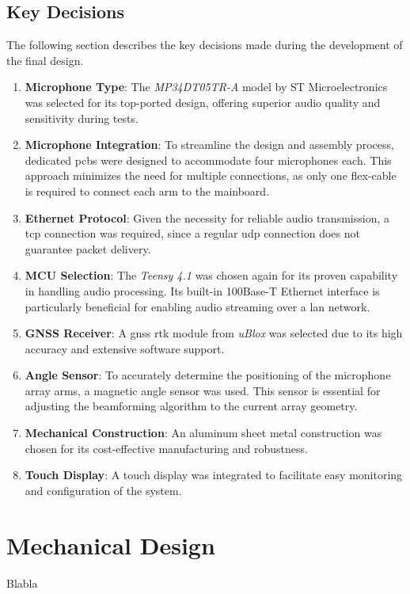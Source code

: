 \subsection{Key Decisions}
The following section describes the key decisions made during the development of the final design.
\begin{enumerate}
	\item \textbf{Microphone Type}: The \textit{MP34DT05TR-A} model by ST Microelectronics was selected for its top-ported design, offering superior audio quality and sensitivity during tests.
	\item \textbf{Microphone Integration}: To streamline the design and assembly process, dedicated \acrshort{pcb}s were designed to accommodate four microphones each.
	      This approach minimizes the need for multiple connections, as only one flex-cable is required to connect each arm to the mainboard.
	\item \textbf{Ethernet Protocol}: Given the necessity for reliable audio transmission, a \acrshort{tcp} connection was required, since a regular \acrshort{udp} connection does not guarantee packet delivery.
	\item \textbf{MCU Selection}: The \textit{Teensy 4.1} was chosen again for its proven capability in handling audio processing.
	      Its built-in 100Base-T Ethernet interface is particularly beneficial for enabling audio streaming over a \acrshort{lan} network.
	\item \textbf{GNSS Receiver}: A \acrshort{gnss} \acrshort{rtk} module from \textit{uBlox} was selected due to its high accuracy and extensive software support.
	\item \textbf{Angle Sensor}: To accurately determine the positioning of the microphone array arms, a magnetic angle sensor was used.
	      This sensor is essential for adjusting the beamforming algorithm to the current array geometry.
	\item \textbf{Mechanical Construction}: An aluminum sheet metal construction was chosen for its cost-effective manufacturing and robustness.
	\item \textbf{Touch Display}: A touch display was integrated to facilitate easy monitoring and configuration of the system.
\end{enumerate}
\newpage

\section{Mechanical Design}
Blabla


